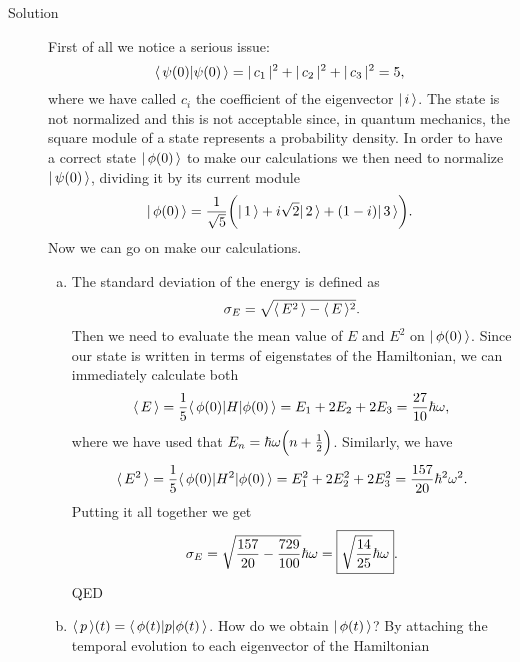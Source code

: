 \begin{description}
    \item[Solution] First of all we notice a serious issue:
    \begin{equation}
        \langle \,  \psi(0) | \psi(0)  \, \rangle = |\, c_1 \,|^2 + |\, c_2 \,|^2 + |\, c_3 \,|^2  = 5,
    \end{equation}
    where we have called $c_i$ the coefficient of the eigenvector $| \, i \, \rangle$. The state is not normalized and this is not acceptable since, in quantum mechanics, the square module of a state represents a probability density. In order to have a correct state $| \, \phi (0) \, \rangle$ to make our calculations we then need to normalize $| \, \psi (0) \, \rangle$, dividing it by its current module
    \begin{equation}
        | \, \phi (0) \, \rangle = \frac{1}{\sqrt{5}} \biggl( | \, 1 \, \rangle + i \sqrt{2} | \, 2 \, \rangle + (1-i) | \, 3 \, \rangle \biggr).
    \end{equation}
    Now we can go on make our calculations.
    \begin{enumerate}[(a)]
        \item The standard deviation of the energy is defined as 
        \begin{equation}
            \label{eq: sigma_E_harmosc}
            \sigma_E = \sqrt{\langle \, E^2 \, \rangle - \langle \, E \, \rangle^2}.
        \end{equation}
        Then we need to evaluate the mean value of $E$ and $E^2$ on $| \,  \phi (0) \, \rangle$. Since our state is written in terms of eigenstates of the Hamiltonian, we can immediately calculate both
        \begin{equation}
            \langle \, E \, \rangle  = \frac{1}{5} \langle \,  \phi (0) | H | \phi(0) \, \rangle = E_1 + 2E_2 + 2E_3 = \frac{27}{10} \hbar \omega,
        \end{equation}
        where we have used that $ E_n = \hbar \omega \Bigl( n + \frac{1}{2} \Bigr)$. Similarly, we have 
        \begin{equation}
            \langle \,  E^2  \, \rangle = \frac{1}{5} \langle \,  \phi (0) | H^2 | \phi(0) \, \rangle = E_1^2 + 2E_2^2 + 2E_3^2 = \frac{157}{20} \hbar^2 \omega^2.
        \end{equation}
        Putting it all together we get
        \begin{equation}
            \label{eq: sigma_E_harmosc_number}
            \sigma_E = \sqrt{\frac{157}{20} - \frac{729}{100}} \hbar \omega = \boxed{\sqrt{\frac{14}{25}} \hbar \omega}. 
        \end{equation}
        QED
        \item $\langle \, p \, \rangle(t) = \langle \, \phi(t) | p | \phi(t) \, \rangle$. How do we obtain $| \, \phi (t) \, \rangle$? By attaching the temporal evolution to each eigenvector of the Hamiltonian 

\end{enumerate}
\end{description}

